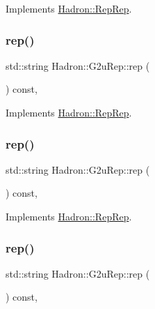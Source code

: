 Implements \mbox{\hyperlink{structHadron_1_1RepRep_ab3213025f6de249f7095892109575fde}{Hadron\+::\+Rep\+Rep}}.

\mbox{\label{structHadron_1_1G2uRep_ad0a703d8c70aacc4601afb6c47ca40b3}} 
\subsubsection{\texorpdfstring{rep()}{rep()}\hspace{0.1cm}{\footnotesize\ttfamily [2/5]}}
{\footnotesize\ttfamily std\+::string Hadron\+::\+G2u\+Rep\+::rep (\begin{DoxyParamCaption}{ }\end{DoxyParamCaption}) const\hspace{0.3cm}{\ttfamily [inline]}, {\ttfamily [virtual]}}



Implements \mbox{\hyperlink{structHadron_1_1RepRep_ab3213025f6de249f7095892109575fde}{Hadron\+::\+Rep\+Rep}}.

\mbox{\label{structHadron_1_1G2uRep_ad0a703d8c70aacc4601afb6c47ca40b3}} 
\subsubsection{\texorpdfstring{rep()}{rep()}\hspace{0.1cm}{\footnotesize\ttfamily [3/5]}}
{\footnotesize\ttfamily std\+::string Hadron\+::\+G2u\+Rep\+::rep (\begin{DoxyParamCaption}{ }\end{DoxyParamCaption}) const\hspace{0.3cm}{\ttfamily [inline]}, {\ttfamily [virtual]}}



Implements \mbox{\hyperlink{structHadron_1_1RepRep_ab3213025f6de249f7095892109575fde}{Hadron\+::\+Rep\+Rep}}.

\mbox{\label{structHadron_1_1G2uRep_ad0a703d8c70aacc4601afb6c47ca40b3}} 
\subsubsection{\texorpdfstring{rep()}{rep()}\hspace{0.1cm}{\footnotesize\ttfamily [4/5]}}
{\footnotesize\ttfamily std\+::string Hadron\+::\+G2u\+Rep\+::rep (\begin{DoxyParamCaption}{ }\end{DoxyParamCaption}) const\hspace{0.3cm}{\ttfamily [inline]}, {\ttfamily [virtual]}}



